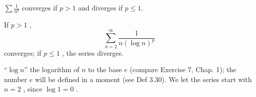 \begin{thm}
    \label{thm:3.28}
    $\sum \frac{1}{n^p}$ converges if $p>1$ and diverges if $p\leq 1$. 
\end{thm}

\begin{thm}
    \label{thm:3.29}
    If $p > 1$ ,
    \begin{equation}
        \sum_{n=2}^{\infty} \frac{1}{n (\log n)^p}
    \end{equation}
    converges; if $p \leq 1$ , the series diverges.
\end{thm}

``$\log n$'' the logarithm of $n$ to the base $e$ (compare Exercise 7, Chap. 1);
the number $e$ will be defined in a moment (see Def 3.30). We let the series start with $n=2$ , since $\log 1 = 0$ .